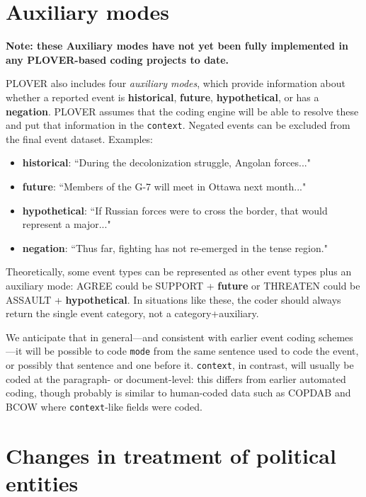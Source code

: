 \documentclass[11pt]{report}
\newcommand{\plcat}[1]{\textsf{#1}}
\newcommand{\plcon}[1]{\textbf{#1}}
\newcommand{\txt}[1]{\texttt{#1}}
\begin{document}
\newpage

\section{Auxiliary modes}\label{ssec:special}

\textbf{Note: these Auxiliary modes have not yet been fully implemented in any PLOVER-based coding projects to date.}

PLOVER also includes four \emph{auxiliary modes}, which provide information about whether a reported event is \plcon{historical}, \plcon{future}, \plcon{hypothetical}, or has a \plcon{negation}. PLOVER assumes that the coding engine will be able to resolve these and put that information in the \txt{context}. Negated events can be excluded from the final event dataset. Examples:
   \begin{itemize}
   \item \plcon{historical}: ``During the decolonization struggle, Angolan forces..."
   \item \plcon{future}: ``Members of the G-7 will meet in Ottawa next month..."
   \item \plcon{hypothetical}: ``If Russian forces were to cross the border, that would represent a major..."
   \item \plcon{negation}: ``Thus far, fighting has not re-emerged in the tense region."	
   \end{itemize}

Theoretically, some event types can be represented as other event types plus an auxiliary mode: \plcat{AGREE} could be  \plcat{SUPPORT} + \plcon{future} or \plcat{THREATEN} could be \plcat{ASSAULT} + \plcon{hypothetical}. In situations like these, the coder should always return the single event category, not a category+auxiliary.

We anticipate that in general---and consistent with earlier event coding schemes---it will be possible to code \txt{mode} from the same sentence used to code the event, or possibly that sentence and one before it. \txt{context}, in contrast, will usually be coded at the paragraph- or document-level: this differs from earlier automated coding, though probably is similar to human-coded data such as COPDAB and BCOW \citep{Leng87} where \txt{context}-like fields were coded.


\section{Changes in treatment of political entities}\label{ssec:change}
\end{document}
